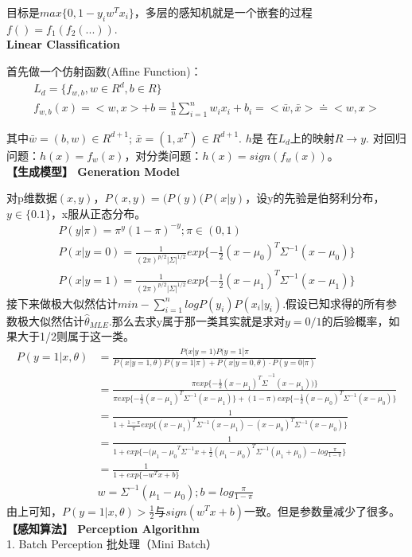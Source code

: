 \documentclass[12pt,UTF8,AutoFakeBold]{article}
\begin{document}
目标是\(max\{0,1-y_{i}w^{T}x_{i}\}\)，多层的感知机就是一个嵌套的过程\(f()=f_{1}(f_{2}(...))\).\\
{\bfseries\kaishu Linear Classification}

首先做一个仿射函数(Affine Function)：
\begin{gather}
L_{d} = \{f_{w,b}, w\in{R^d}, b\in{R}\}\\
f_{w,b}(x) = <w,x> + b = \frac{1}{n}\sum _{i=1}^{n}{w_{i}x_{i} + b_i}= <\bar{w},\bar{x}> \doteq <w,x>
\end{gather}

其中\(\bar{w} = (b,w)\in{R^{d+1}}\); \(\bar{x} = (1, x^{T})\in{R^{d+1}}\). \(h\)是 在\(L_d\)上的映射\(R\rightarrow y\). 对回归问题：\(h(x)=f_w(x)\)，对分类问题：\(h(x)=sign(f_w(x))\)。\\

\textbf{【生成模型】 Generation Model}

对p维数据\((x,y)\)，\(P(x,y)=(P(y)(P(x|y)\)，设y的先验是伯努利分布，\(y\in{\{0.1\}}\)，x服从正态分布。
\begin{gather}
P(y|\pi)=\pi^{y}(1-\pi)^{-y}; \pi\in(0,1)\\
P(x|y=0)=\frac {1}{{(2\pi)}^{p/2}{\left|\Sigma\right|}^{1/2}}exp\{ -\frac{1}{2}{(x-{\mu}_{0})}^{T}{\Sigma}^{-1}{(x-{\mu}_{0})}\}\\
P(x|y=1)=\frac {1}{{(2\pi)}^{p/2}{\left|\Sigma\right|}^{1/2}}exp\{ -\frac{1}{2}{(x-{\mu}_{1})}^{T}{\Sigma}^{-1}{(x-{\mu}_{1})}\}
\end{gather}
接下来做极大似然估计\(min-\sum_{i=1}^{n}{logP({y}_{i})} P(x_{i}|{y}_{i})\).假设已知求得的所有参数极大似然估计\({\hat{\theta}}_{MLE}\).那么去求y属于那一类其实就是求对\(y=0/1\)的后验概率，如果大于1/2则属于这一类。
\begin{equation}
\begin{aligned}
P(y=1|x,\theta)&=\frac{P(x|y=1)P(y=1|\pi}{P(x|y=1,\theta )P(y=1|\pi)+P(x|y=0,\theta )\cdot P(y=0|\pi)} \\
&=\frac{\pi exp {\{ -\frac{1}{2} {(x-\mu_1)}^{T}\Sigma}^{-1}{(x-\mu_1))\}}} {\pi exp \{-\frac{1}{2}{(x-\mu_1)}^{T}\Sigma^{-1}(x-\mu_1)\}+(1-\pi)exp\{-\frac{1}{2} {(x-\mu_0)}^{T} \Sigma^{-1}(x-\mu_0)\}}\\
&=\frac{1}{1+\frac{1-\pi}{\pi}exp \{ {(x-\mu_1)}^{T} {\Sigma}^{-1} (x-\mu_1)-{(x-\mu_0)}^{T} {\Sigma}^{-1}(x-{\mu}_{0})\}}\\
&=\frac{1}{1+exp\{-{({\mu}_{1}-{\mu}_{0}}^{T}{\Sigma}^{-1}x+\frac{1}{2}{({\mu}_{1}-{\mu}_{0})}^{T}{\Sigma}^{-1}({\mu}_{1}+{\mu}_{0})-log\frac{\pi}{1-\pi}\}}\\
&=\frac{1}{1+exp\{-w^Tx+b\}} \\
&w = \Sigma^{-1}(\mu_1-\mu_0); b=log\frac{\pi}{1-\pi}
\end{aligned}
\end{equation}
由上可知，\(P(y=1|x,\theta)>\frac{1}{2}\)与\(sign(w^Tx+b)\)一致。但是参数量减少了很多。\\
\textbf{【感知算法】 Perception Algorithm}
\\
1. Batch Perception 批处理（Mini Batch）\\
\end{document}
